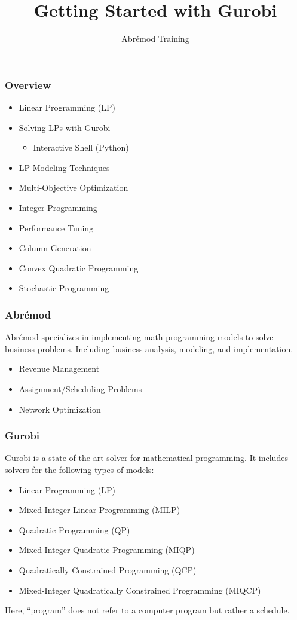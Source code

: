 \documentclass[12pt,handout]{beamer}
\title{Getting Started with Gurobi}
\author{Abr\'emod Training}
\begin{document}
\begin{frame}
\titlepage
\end{frame}

\begin{frame}
\frametitle{Overview}
\begin{itemize}
\item Linear Programming (LP)
\item Solving LPs with Gurobi
    \begin{itemize}
    \item Interactive Shell (Python)
    \end{itemize}
\item LP Modeling Techniques
\item Multi-Objective Optimization
\item Integer Programming
\item Performance Tuning
\item Column Generation
\item Convex Quadratic Programming
\item Stochastic Programming
\end{itemize}
\end{frame}

\begin{frame}
  \frametitle{Abr\'emod}
Abr\'emod specializes in implementing math programming models to solve business problems.
Including business analysis, modeling, and implementation.
\begin{itemize}
\item Revenue Management
\item Assignment/Scheduling Problems
\item Network Optimization
\end{itemize}
\end{frame}

\begin{frame}
\frametitle{Gurobi}
Gurobi is a state-of-the-art solver for mathematical programming. It includes solvers for the following types of models:
\begin{itemize}
\item Linear Programming (LP)
\item Mixed-Integer Linear Programming (MILP)
\item Quadratic Programming (QP)
\item Mixed-Integer Quadratic Programming (MIQP)
\item Quadratically Constrained Programming (QCP)
\item Mixed-Integer Quadratically Constrained Programming (MIQCP)
\end{itemize}
Here, ``program'' does not refer to a computer program but rather a schedule.
\end{frame}
\end{document}
